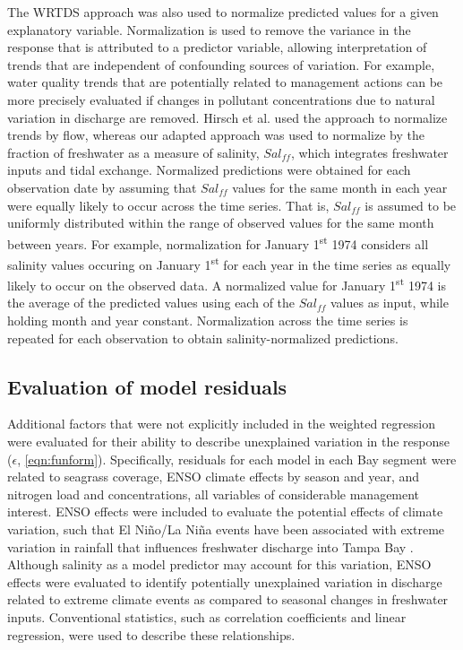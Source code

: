 \documentclass{svjour3}\usepackage[]{graphicx}\usepackage[]{color}
\begin{document}
The \ac{WRTDS} approach was also used to normalize predicted values for a given explanatory variable.  Normalization is used to remove the variance in the response that is attributed to a predictor variable, allowing interpretation of trends that are independent of confounding sources of variation.  For example, water quality trends that are potentially related to management actions can be more precisely evaluated if changes in pollutant concentrations due to natural variation in discharge are removed.  Hirsch et al. \cite{Hirsch10} used the approach to normalize trends by flow, whereas our adapted approach was used to normalize by the fraction of freshwater as a measure of salinity, $Sal_{ff}$, which integrates freshwater inputs and tidal exchange.  Normalized predictions were obtained for each observation date by assuming that $Sal_{ff}$ values for the same month in each year were equally likely to occur across the time series.  That is, $Sal_{ff}$ is assumed to be uniformly distributed within the range of observed values for the same month between years.  For example, normalization for January 1\textsuperscript{st} 1974 considers all salinity values occuring on January 1\textsuperscript{st} for each year in the time series as equally likely to occur on the observed data.  A normalized value for January 1\textsuperscript{st} 1974 is the average of the predicted values using each of the $Sal_{ff}$ values as input, while holding month and year constant.  Normalization across the time series is repeated for each observation to obtain salinity-normalized predictions.    

\subsection{Evaluation of model residuals}

Additional factors that were not explicitly included in the weighted regression were evaluated for their ability to describe unexplained variation in the response ($\epsilon$, \cref{eqn:funform}). Specifically, residuals for each model in each Bay segment were related to seagrass coverage, \ac{ENSO} climate effects by season and year, and nitrogen load and concentrations, all variables of considerable management interest.  \ac{ENSO} effects were included to evaluate the potential effects of climate variation, such that El Ni\~{n}o/La Ni\~{n}a events have been associated with extreme variation in rainfall that influences freshwater discharge into Tampa Bay \cite{Schmidt02}.  Although salinity as a model predictor may account for this variation, \ac{ENSO} effects were evaluated to identify potentially unexplained variation in discharge related to extreme climate events as compared to seasonal changes in freshwater inputs. Conventional statistics, such as correlation coefficients and linear regression, were used to describe these relationships.
\end{document}
